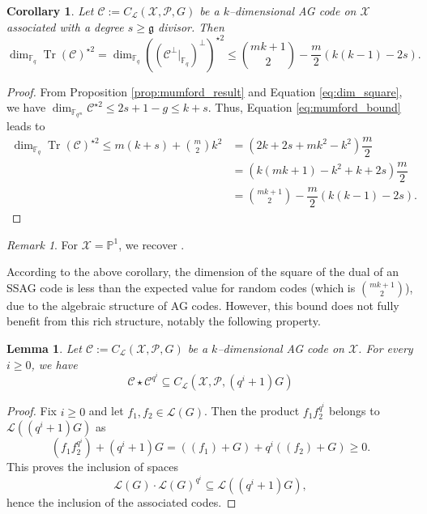 \documentclass[a4paper]{amsart}
\newtheorem{coro}[thm]{Corollary}
\newtheorem{lemma}[thm]{Lemma}
\theoremstyle{definition}
\theoremstyle{remark}
\newtheorem{remark}[thm]{Remark}
\DeclareMathOperator{\trace}{Tr}
\newcommand{\calL}{\mathcal{L}}
\newcommand{\calC}{\mathcal{C}}
\newcommand{\calX}{\mathcal{X}}
\newcommand{\fqm}{\mathbb{F}_{q^m}}
\newcommand{\fq}{\mathbb{F}_{q}}
\newcommand{\PP}{\mathbb{P}}
\newcommand{\Tr}[1]{\trace\!\left(#1\right)}
\begin{document}
\begin{coro} \label{coro:1st_bound_mumford}
 Let $\mathcal{C} := C_{\calL}(\calX,\mathcal{P},G)$ be a $k$--dimensional AG code on $\calX$ associated with a degree $s \geq \mathfrak{g}$ divisor. Then
 \[ \dim_{\fq}\Tr{\calC}^{\star2} = \dim_{\fq} \left((\calC^\perp|_{\fq})^{\perp}\right)^{\star2}  \leq \binom{mk+1}{2} - \dfrac{m}{2} (k(k-1)-2s).\]
\end{coro}

\begin{proof}
 From Proposition \ref{prop:mumford_result} and Equation \eqref{eq:dim_square}, we have $\dim_{\fqm}\calC^{\star2} \leq 2s+1-g \leq k+s$. Thus, Equation \eqref{eq:mumford_bound} leads to
 \begin{align*}
  \dim_{\fq}\Tr{\calC}^{\star2} \leq m(k+s) + \binom{m}{2}k^2 &= (2k+2s+mk^2-k^2) \dfrac{m}{2} \\
  &= (k(mk+1)-k^2+k+2s) \dfrac{m}{2} \\
  &= \binom{mk+1}{2} - \dfrac{m}{2}(k(k-1)-2s) .
 \end{align*}
\end{proof}

\begin{remark}
	For $\calX=\PP^1$, we recover \cite[Theorem 17]{MT21}.
\end{remark}

According to the above corollary, the dimension of the square of the dual of an SSAG code is less than the expected value for random codes (which is $\binom{mk+1}{2}$), due to the algebraic structure of AG codes. However, this bound does not fully benefit from this rich structure, notably the following property.

\begin{lemma}\label{lem:Schur-Product-Power}
	 Let $\mathcal{C} := C_{\calL}(\calX,\mathcal{P},G)$ be a $k$--dimensional AG code on $\calX$. For every $i \geq 0$, we have
	 \[\calC \star \calC^{q^i} \subseteq C_{\calL}(\calX,\mathcal{P},(q^i+1)G)\]
\end{lemma}

\begin{proof}
	Fix $i \geq 0$ and let $f_1,f_2 \in \calL(G)$. Then the product $f_1f_2^{q^i}$ belongs to $\calL((q^i+1)G)$ as
	$$(f_1f_2^{q^i}) + (q^i+1)G = \left((f_1) + G\right) + q^i\left((f_2) + G\right) \geq 0.$$
	This proves the inclusion of spaces
	$$ \calL(G)\cdot \calL(G)^{q^i} \subseteq \calL((q^i+1)G),$$
	hence the inclusion of the associated codes.
\end{proof}
\end{document}
